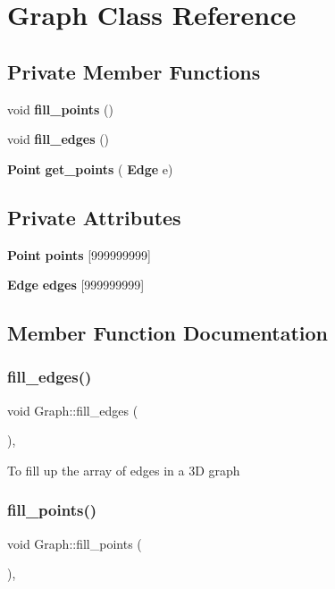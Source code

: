 \section{Graph Class Reference}
\label{class_graph}
\subsection*{Private Member Functions}
\begin{DoxyCompactItemize}
\item 
void \textbf{ fill\+\_\+points} ()
\item 
void \textbf{ fill\+\_\+edges} ()
\item 
\textbf{ Point} \textbf{ get\+\_\+points} (\textbf{ Edge} e)
\end{DoxyCompactItemize}
\subsection*{Private Attributes}
\begin{DoxyCompactItemize}
\item 
\textbf{ Point} \textbf{ points} [999999999]
\item 
\textbf{ Edge} \textbf{ edges} [999999999]
\end{DoxyCompactItemize}


\subsection{Member Function Documentation}
\mbox{\label{class_graph_a7fe23a282f054a4d90a59ea8fe78a6bd}} 
\subsubsection{fill\+\_\+edges()}
{\footnotesize\ttfamily void Graph\+::fill\+\_\+edges (\begin{DoxyParamCaption}{ }\end{DoxyParamCaption})\hspace{0.3cm}{\ttfamily [inline]}, {\ttfamily [private]}}

To fill up the array of edges in a 3D graph \mbox{\label{class_graph_aa658308c39b7c563c1bbd923cce964b6}} 
\subsubsection{fill\+\_\+points()}
{\footnotesize\ttfamily void Graph\+::fill\+\_\+points (\begin{DoxyParamCaption}{ }\end{DoxyParamCaption})\hspace{0.3cm}{\ttfamily [inline]}, {\ttfamily [private]}}

